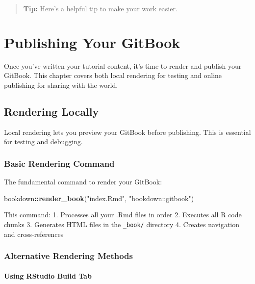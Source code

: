 \documentclass[
]{book}
\newenvironment{Shaded}{\begin{snugshade}}{\end{snugshade}}
\newcommand{\FunctionTok}[1]{\textcolor[rgb]{0.13,0.29,0.53}{\textbf{#1}}}
\newcommand{\NormalTok}[1]{#1}
\newcommand{\SpecialCharTok}[1]{\textcolor[rgb]{0.81,0.36,0.00}{\textbf{#1}}}
\newcommand{\StringTok}[1]{\textcolor[rgb]{0.31,0.60,0.02}{#1}}
\begin{document}
\begin{quote}
\textbf{Tip:} Here's a helpful tip to make your work easier.
\end{quote}

\chapter{Publishing Your GitBook}\label{publish}

Once you've written your tutorial content, it's time to render and publish your GitBook. This chapter covers both local rendering for testing and online publishing for sharing with the world.

\section{Rendering Locally}\label{rendering-locally}

Local rendering lets you preview your GitBook before publishing. This is essential for testing and debugging.

\subsection{Basic Rendering Command}\label{basic-rendering-command}

The fundamental command to render your GitBook:

\begin{Shaded}
\begin{Highlighting}[]
\NormalTok{bookdown}\SpecialCharTok{::}\FunctionTok{render\_book}\NormalTok{(}\StringTok{"index.Rmd"}\NormalTok{, }\StringTok{"bookdown::gitbook"}\NormalTok{)}
\end{Highlighting}
\end{Shaded}

This command:
1. Processes all your .Rmd files in order
2. Executes all R code chunks
3. Generates HTML files in the \texttt{\_book/} directory
4. Creates navigation and cross-references

\subsection{Alternative Rendering Methods}\label{alternative-rendering-methods}

\subsubsection{Using RStudio Build Tab}\label{using-rstudio-build-tab}
\end{document}
